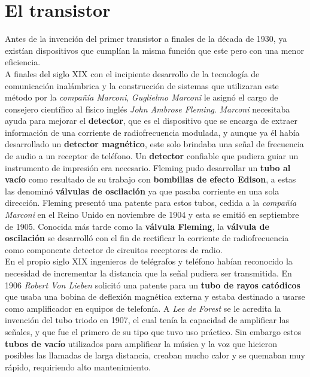 \chapter{El transistor}\label{chapter:transistor}

Antes de la invención del primer transistor a finales de la década de 1930, ya existían dispositivos que cumplían la misma función que 
este pero con una menor eficiencia.\\
\indent A finales del siglo XIX con el incipiente desarrollo de la tecnología de comunicación inalámbrica y la construcción de sistemas
que utilizaran este método por la \emph{compañía Marconi}, \emph{Guglielmo Marconi} le asignó el cargo de consejero científico al físico
inglés \emph{John Ambrose Fleming}. \emph{Marconi} necesitaba ayuda para mejorar el \textbf{detector}, que es el dispositivo que se
encarga de extraer información de una corriente de radiofrecuencia modulada, y aunque ya él había desarrollado un \textbf{detector
magnético}, este solo brindaba una señal de frecuencia de audio a un receptor de teléfono. Un \textbf{detector} confiable que pudiera
guiar un instrumento de impresión era necesario. Fleming pudo desarrollar un \textbf{tubo al vacío} como resultado de su trabajo con
\textbf{bombillas de efecto Edison}, a estas las denominó \textbf{válvulas de oscilación} ya que pasaba corriente en una sola dirección.
Fleming presentó una patente para estos tubos, cedida a la \emph{compañía Marconi} en el Reino Unido en noviembre de 1904 y esta se emitió
en septiembre de 1905. Conocida más tarde como la \textbf{válvula Fleming}, la \textbf{válvula de oscilación} se desarrolló con el fin de
rectificar la corriente de radiofrecuencia como componente detector de circuitos receptores de radio. \\
\indent En el propio siglo XIX ingenieros de telégrafos y teléfono habían reconocido la necesidad de incrementar la distancia que la señal
pudiera ser transmitida. En 1906 \emph{Robert Von Lieben} solicitó una patente para un \textbf{tubo de rayos catódicos} que usaba una bobina
de deflexión magnética externa y estaba destinado a usarse como amplificador en equipos de telefonía. A \emph{Lee de Forest} se le acredita
la invención del tubo triodo en 1907, el cual tenía la capacidad de amplificar las señales, y que fue el primero de su tipo que tuvo uso
práctico. Sin embargo estos \textbf{tubos de vacío} utilizados para amplificar la música y la voz que hicieron posibles las llamadas de
larga distancia, creaban mucho calor y se quemaban muy rápido, requiriendo alto mantenimiento. \\
